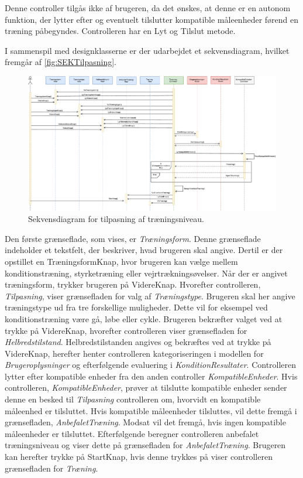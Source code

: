\noindent 
Denne controller tilgås ikke af brugeren, da det ønskes, at denne er en autonom funktion, der lytter efter og eventuelt tilslutter kompatible måleenheder førend en træning påbegyndes. Controlleren har en Lyt og Tilslut metode. 

I sammenspil med designklasserne er der udarbejdet et sekvensdiagram, hvilket fremgår af \autoref{fig:SEKTilpasning}. 

\begin{figure} [H]
\centering
\includegraphics[width=1.5\textwidth, angle=90]{figures/Sek/SEKTilpasning}
\caption{Sekvensdiagram for tilpasning af træningsniveau.}
\label{fig:SEKTilpasning}
\end{figure}

\noindent
Den første grænseflade, som vises, er \textit{Træningsform}. Denne grænseflade indeholder et tekstfelt, der beskriver, hvad brugeren skal angive. Dertil er der opstillet en TræningsformKnap, hvor brugeren kan vælge mellem konditionstræning, styrketræning eller vejrtrækningsøvelser. Når der er angivet træningsform, trykker brugeren på VidereKnap. Hvorefter controlleren, \textit{Tilpasning}, viser grænsefladen for valg af \textit{Træningstype}. Brugeren skal her angive træningstype ud fra tre forskellige muligheder. Dette vil for eksempel ved konditionstræning være gå, løbe eller cykle. Brugeren bekræfter valget ved at trykke på VidereKnap, hvorefter controlleren viser grænsefladen for \textit{Helbredstilstand}. Helbredstilstanden angives og bekræftes ved at trykke på VidereKnap, herefter henter controlleren kategoriseringen i modellen for \textit{Brugeroplysninger} og efterfølgende evaluering i \textit{KonditionResultater}.
Controlleren lytter efter kompatible enheder fra den anden controller \textit{KompatibleEnheder}. Hvis controlleren, \textit{KompatibleEnheder}, prøver at tilslutte kompatible enheder sender denne en besked til \textit{Tilpasning} controlleren om, hvorvidt en kompatible måleenhed er tilsluttet. Hvis kompatible måleenheder tilsluttes, vil dette fremgå i grænsefladen, \textit{AnbefaletTræning}. Modsat vil det fremgå, hvis ingen kompatible måleenheder er tilsluttet. 
Efterfølgende beregner controlleren anbefalet træningsniveau og viser dette på grænsefladen for \textit{AnbefaletTræning}. Brugeren kan herefter trykke på StartKnap, hvis denne trykkes på viser controlleren grænsefladen for \textit{Træning}. 
